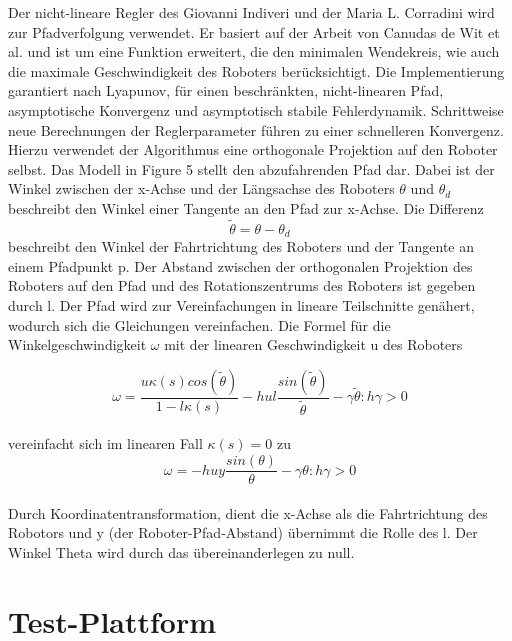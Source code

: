 \documentclass[11pt,a4paper]{article}
\begin{document}
{	Der nicht-lineare Regler des Giovanni Indiveri und der Maria L. Corradini\cite{Giovanni} wird zur Pfadverfolgung verwendet. Er basiert auf der Arbeit von Canudas de Wit et al. \cite{Canudas} und ist um eine Funktion erweitert, die den  minimalen Wendekreis, wie auch die maximale Geschwindigkeit des Roboters ber\"ucksichtigt. Die Implementierung garantiert nach Lyapunov, f\"ur einen beschr\"ankten, nicht-linearen Pfad, asymptotische Konvergenz und asymptotisch stabile Fehlerdynamik. Schrittweise neue Berechnungen der Reglerparameter f\"uhren zu einer schnelleren Konvergenz. Hierzu verwendet der Algorithmus eine orthogonale Projektion auf den Roboter selbst. Das Modell in Figure 5 stellt den abzufahrenden Pfad dar. Dabei ist der Winkel zwischen der x-Achse und der L\"angsachse des Roboters $\theta$ und $\theta_{d}$
beschreibt den Winkel einer Tangente an den Pfad zur 
x-Achse. Die Differenz 
\begin{equation}
\tilde{\theta} = \theta -\theta_{d}
\end{equation}
beschreibt den Winkel der Fahrtrichtung des Roboters und der Tangente an einem Pfadpunkt p. Der Abstand zwischen der orthogonalen Projektion des Roboters auf den Pfad und des Rotationszentrums des Roboters ist gegeben durch l.
Der Pfad wird zur Vereinfachungen in lineare Teilschnitte gen\"ahert, wodurch sich die Gleichungen vereinfachen. Die Formel f\"ur die Winkelgeschwindigkeit $\omega$ mit der linearen Geschwindigkeit u des Roboters


\begin{equation}
\omega=  \frac{u \kappa(s) cos(\tilde{\theta})}{1-l \kappa(s)}-h u l  \frac{sin(\tilde{\theta})}{\tilde{\theta}}-\gamma\tilde{\theta} :h\gamma > 0
\end{equation}\\

vereinfacht sich im linearen Fall $\kappa(s)=0$ zu \\

\begin{equation}
\omega= -h u y  \frac{sin(\theta)}{\theta}-\gamma\theta :h\gamma > 0
\end{equation}\\



	Durch Koordinatentransformation, dient die x-Achse als die Fahrtrichtung des Robotors  und y (der Roboter-Pfad-Abstand) \"ubernimmt die Rolle des l. Der Winkel Theta wird durch das \"ubereinanderlegen zu null.


\section{Test-Plattform}
}
\end{document}

